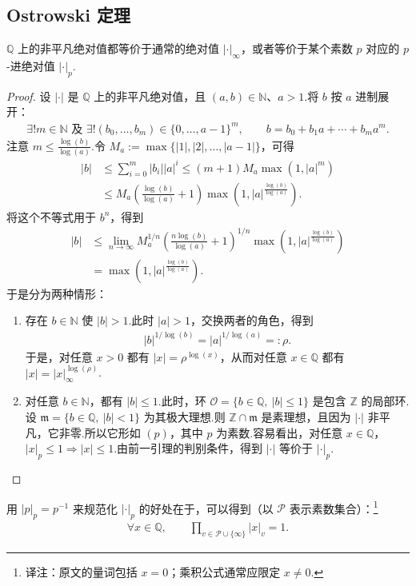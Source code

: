 \subsection{Ostrowski 定理}\label{sec:nt-4-1-3}
\begin{theorem*}[Ostrowski]
$\mathbb Q$ 上的非平凡绝对值都等价于通常的绝对值 $|\cdot|_\infty$，或者等价于某个素数 $p$ 对应的 $p$-进绝对值 $|\cdot|_p$.
\end{theorem*}
\begin{proof}
设 $|\cdot|$ 是 $\mathbb Q$ 上的非平凡绝对值，且 $(a,b)\in\mathbb N$、$a>1$.将 $b$ 按 $a$ 进制展开：
\begin{align*}
\exists!m\in\mathbb N\text{ 及 }\exists!(b_0,\ldots,b_m)\in\{0,\ldots,a-1\}^m,
\qquad b=b_0+b_1a+\cdots+b_ma^m.
\end{align*}
注意 $m\le\frac{\log(b)}{\log(a)}$.令 $M_a:=\max\{|1|,|2|,\ldots,|a-1|\}$，可得
\begin{align*}
|b|&\le\sum_{i=0}^m|b_i||a|^i
\le(m+1)M_a\max(1,|a|^m)\\
&\le M_a\left(\frac{\log(b)}{\log(a)}+1\right)
\max\left(1,|a|^{\frac{\log(b)}{\log(a)}}\right).
\end{align*}
将这个不等式用于 $b^n$，得到
\begin{align*}
|b|&\le\lim_{n\to\infty}M_a^{1/n}
\left(\frac{n\log(b)}{\log(a)}+1\right)^{1/n}
\max\left(1,|a|^{\frac{\log(b)}{\log(a)}}\right)\\
&=\max\left(1,|a|^{\frac{\log(b)}{\log(a)}}\right).
\end{align*}
于是分为两种情形：
\begin{enumerate}[label=\roman*)]
\item 存在 $b\in\mathbb N$ 使 $|b|>1$.此时 $|a|>1$，交换两者的角色，得到
\begin{align*}
|b|^{1/\log(b)}=|a|^{1/\log(a)}=:\rho.
\end{align*}
于是，对任意 $x>0$ 都有 $|x|=\rho^{\log(x)}$，从而对任意 $x\in\mathbb Q$ 都有 $|x|=|x|_\infty^{\log(\rho)}$.
\item 对任意 $b\in\mathbb N$，都有 $|b|\le1$.此时，环 $\mathcal O=\{b\in\mathbb Q,\ |b|\le1\}$ 是包含 $\mathbb Z$ 的局部环.设 $\mathfrak m=\{b\in\mathbb Q,\ |b|<1\}$ 为其极大理想.则 $\mathbb Z\cap\mathfrak m$ 是素理想，且因为 $|\cdot|$ 非平凡，它非零.所以它形如 $(p)$，其中 $p$ 为素数.容易看出，对任意 $x\in\mathbb Q$，$|x|_p\le1\Rightarrow |x|\le1$.由前一引理的判别条件，得到 $|\cdot|$ 等价于 $|\cdot|_p$.
\end{enumerate}
\end{proof}
\begin{remark*}
用 $|p|_p=p^{-1}$ 来规范化 $|\cdot|_p$ 的好处在于，可以得到（以 $\mathcal P$ 表示素数集合）：\footnote{译注：原文的量词包括 $x=0$；乘积公式通常应限定 $x\ne0$.}
\begin{align*}
\forall x\in\mathbb Q,\qquad\prod_{v\in\mathcal P\cup\{\infty\}}|x|_v=1.
\end{align*}
\end{remark*}
